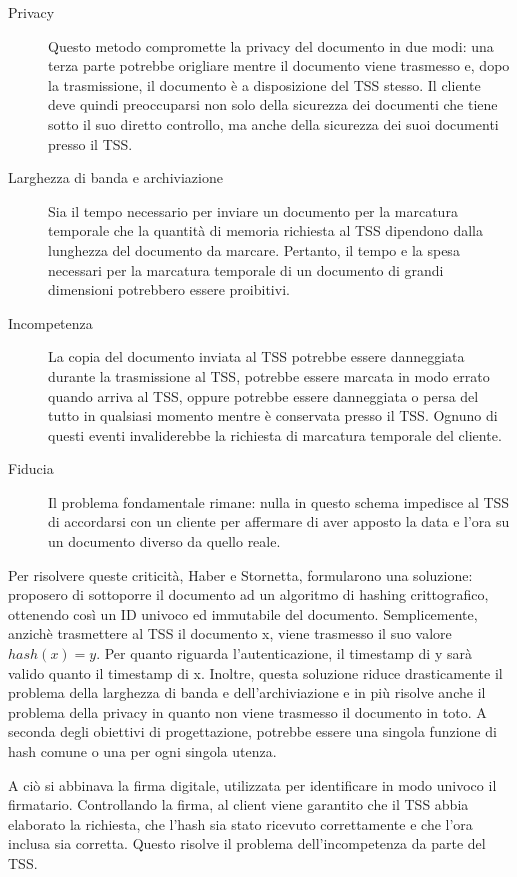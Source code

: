 \begin{description}
  \item[Privacy] Questo metodo compromette la privacy del documento in due modi: una terza parte potrebbe origliare mentre il documento viene trasmesso e, dopo la trasmissione, il documento è a disposizione del TSS stesso. Il cliente deve quindi preoccuparsi non solo della sicurezza dei documenti che tiene sotto il suo diretto controllo, ma anche della sicurezza dei suoi documenti presso il TSS.
  \item[Larghezza di banda e archiviazione] Sia il tempo necessario per inviare un documento per la marcatura temporale che la quantità di memoria richiesta al TSS dipendono dalla lunghezza del documento da marcare. Pertanto, il tempo e la spesa necessari per la marcatura temporale di un documento di grandi dimensioni potrebbero essere proibitivi. 
  \item[Incompetenza] La copia del documento inviata al TSS potrebbe essere danneggiata durante la trasmissione al TSS, potrebbe essere marcata in modo errato quando arriva al TSS, oppure potrebbe essere danneggiata o persa del tutto in qualsiasi momento mentre è conservata presso il TSS. Ognuno di questi eventi invaliderebbe la richiesta di marcatura temporale del cliente.
  \item[Fiducia] Il problema fondamentale rimane: nulla in questo schema impedisce al TSS di accordarsi con un cliente per affermare di aver apposto la data e l'ora su un documento diverso da quello reale.
\end{description}

Per risolvere queste criticità, Haber e Stornetta, formularono una soluzione: proposero di sottoporre il documento ad un algoritmo di hashing crittografico, ottenendo così un ID univoco ed immutabile del documento.
Semplicemente, anzichè trasmettere al TSS il documento x, viene trasmesso il suo valore \(hash(x) = y\). Per quanto riguarda l'autenticazione, il timestamp di y sarà valido quanto il timestamp di x. Inoltre, questa soluzione riduce drasticamente il problema della larghezza di banda e dell'archiviazione e in più risolve anche il problema della privacy in quanto non viene trasmesso il documento in toto. A seconda degli obiettivi di progettazione, potrebbe essere una singola funzione di hash comune o una per ogni singola utenza.

A ciò si abbinava la firma digitale, utilizzata per identificare in modo univoco il firmatario. Controllando la firma, al client viene garantito che il TSS abbia elaborato la richiesta, che l'hash sia stato ricevuto correttamente e che l'ora inclusa sia corretta. Questo risolve il problema dell'incompetenza da parte del TSS.


